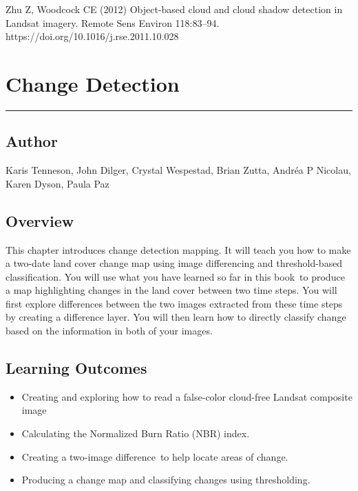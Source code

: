 \documentclass[
  letterpaper,
  DIV=11,
  numbers=noendperiod]{scrreprt}
\providecommand{\tightlist}{%
  \setlength{\itemsep}{0pt}\setlength{\parskip}{0pt}}\usepackage{longtable,booktabs,array}
\begin{document}
Zhu Z, Woodcock CE (2012) Object-based cloud and cloud shadow detection
in Landsat imagery. Remote Sens Environ 118:83--94.
https://doi.org/10.1016/j.rse.2011.10.028

\hypertarget{change-detection}{%
\chapter{Change Detection}\label{change-detection}}

\begin{center}\rule{0.5\linewidth}{0.5pt}\end{center}

\hypertarget{author-9}{%
\section*{Author}\label{author-9}}


Karis Tenneson, John Dilger, Crystal Wespestad, Brian Zutta, Andréa P
Nicolau, Karen Dyson, Paula Paz

\hypertarget{overview-11}{%
\section*{Overview}\label{overview-11}}


This chapter introduces change detection mapping. It will teach you how
to make a two-date land cover change map using image differencing and
threshold-based classification. You will use what you have learned so
far in this book~to produce a map highlighting changes in the land cover
between two time steps. You will first explore differences between the
two images extracted from these time steps by creating a difference
layer. You will then learn how to directly classify change based on the
information in both of your images.

\hypertarget{learning-outcomes-11}{%
\section*{Learning Outcomes}\label{learning-outcomes-11}}


\begin{itemize}
\tightlist
\item
  Creating and exploring how to read a false-color cloud-free Landsat
  composite image
\item
  Calculating the Normalized Burn Ratio (NBR) index. ~
\item
  Creating a two-image difference~to help locate areas of change.
\item
  Producing a change map and classifying changes using thresholding.
\end{itemize}
\end{document}
